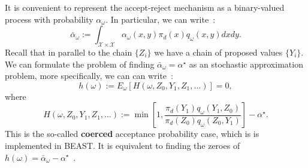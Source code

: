 It is convenient to represent the accept-reject mechanism as a binary-valued process with probability $\alpha_\omega$.
In particular, we can write~\citep{Andrieu2008}:
$$\bar{\alpha}_\omega := \int_{\mathcal{X} \times \mathcal{X}} \alpha_\omega(x, y)\pi_d(x) q_\omega(x, y) dxdy.$$
Recall that in parallel to the chain $\{Z_i\}$ we have a chain of proposed values $\{Y_i\}$.
We can formulate the problem of finding $\bar{\alpha}_\omega = \alpha^\star$ as an stochastic approximation problem, more specifically, we can can write~\cite[eq. 17]{Andrieu2008}:
$$ h(\omega) := E_\omega[ H(\omega, Z_0, Y_1, Z_1, \ldots) ] = 0,$$
where
$$ H(\omega, Z_0, Y_1, Z_1, \ldots) :=  \min \left[1, \frac{\pi_d(Y_1) q_\omega(Y_1, Z_0)}{\pi_d(Z_0) q_\omega(Z_0, Y_1)} \right] - \alpha^\star.$$
This is the so-called \textbf{coerced} acceptance probability case, which is is implemented in BEAST.
It is equivalent to finding the zeroes of $h(\omega) = \bar{\alpha}_\omega- \alpha^\star$~\citep{Andrieu2008}.


